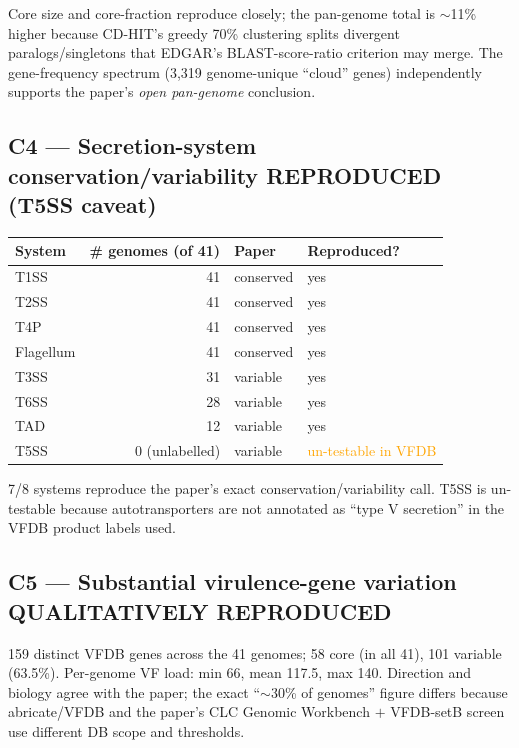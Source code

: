 \documentclass[11pt]{article}
\begin{document}
Core size and core-fraction reproduce closely; the pan-genome total is $\sim$11\%
higher because CD-HIT's greedy 70\% clustering splits divergent paralogs/singletons
that EDGAR's BLAST-score-ratio criterion may merge. The gene-frequency spectrum
(3{,}319 genome-unique ``cloud'' genes) independently supports the paper's
\emph{open pan-genome} conclusion.

\subsection*{C4 --- Secretion-system conservation/variability \textcolor{green!60!black}{REPRODUCED (T5SS caveat)}}
\begin{tabular}{lrll}
\toprule
System & \# genomes (of 41) & Paper & Reproduced? \\
\midrule
T1SS       & 41 & conserved & \textcolor{green!60!black}{yes} \\
T2SS       & 41 & conserved & \textcolor{green!60!black}{yes} \\
T4P        & 41 & conserved & \textcolor{green!60!black}{yes} \\
Flagellum  & 41 & conserved & \textcolor{green!60!black}{yes} \\
T3SS       & 31 & variable  & \textcolor{green!60!black}{yes} \\
T6SS       & 28 & variable  & \textcolor{green!60!black}{yes} \\
TAD        & 12 & variable  & \textcolor{green!60!black}{yes} \\
T5SS       & 0 (unlabelled) & variable & \textcolor{orange}{un-testable in VFDB} \\
\bottomrule
\end{tabular}

7/8 systems reproduce the paper's exact conservation/variability call. T5SS is
un-testable because autotransporters are not annotated as ``type V secretion'' in
the VFDB product labels used.

\subsection*{C5 --- Substantial virulence-gene variation \textcolor{green!60!black}{QUALITATIVELY REPRODUCED}}
159 distinct VFDB genes across the 41 genomes; 58 core (in all 41), 101 variable (63.5\%).
Per-genome VF load: min 66, mean 117.5, max 140. Direction and biology agree with the
paper; the exact ``$\sim$30\% of genomes'' figure differs because abricate/VFDB and the
paper's CLC Genomic Workbench $+$ VFDB-setB screen use different DB scope and thresholds.
\end{document}
